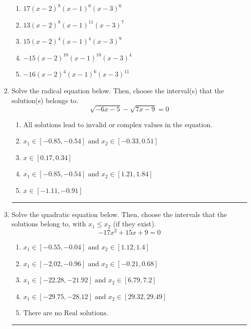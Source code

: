 \documentclass[14pt]{extbook}
\newcommand{\litem}[1]{\item#1\hspace*{-1cm}\rule{\textwidth}{0.4pt}}
\begin{document}
\begin{enumerate}
{\begin{center}
\end{center}
\begin{enumerate}[label=\Alph*.]
\item \( 17(x - 2)^{8} (x - 1)^{6} (x - 3)^{6} \)
\item \( 13(x - 2)^{8} (x - 1)^{11} (x - 3)^{7} \)
\item \( 15(x - 2)^{4} (x - 1)^{4} (x - 3)^{9} \)
\item \( -15(x - 2)^{10} (x - 1)^{10} (x - 3)^{4} \)
\item \( -16(x - 2)^{4} (x - 1)^{6} (x - 3)^{11} \)

\end{enumerate} }
\litem{
Solve the radical equation below. Then, choose the interval(s) that the solution(s) belongs to.\[ \sqrt{-6 x - 5} - \sqrt{7 x - 9} = 0 \]\begin{enumerate}[label=\Alph*.]
\item \( \text{All solutions lead to invalid or complex values in the equation.} \)
\item \( x_1 \in [-0.85, -0.54] \text{ and } x_2 \in [-0.33,0.51] \)
\item \( x \in [0.17,0.34] \)
\item \( x_1 \in [-0.85, -0.54] \text{ and } x_2 \in [1.21,1.84] \)
\item \( x \in [-1.11,-0.91] \)

\end{enumerate} }
\litem{
Solve the quadratic equation below. Then, choose the intervals that the solutions belong to, with $x_1 \leq x_2$ (if they exist).\[ -17x^{2} +15 x + 9 = 0 \]\begin{enumerate}[label=\Alph*.]
\item \( x_1 \in [-0.55, -0.04] \text{ and } x_2 \in [1.12, 1.4] \)
\item \( x_1 \in [-2.02, -0.96] \text{ and } x_2 \in [-0.21, 0.68] \)
\item \( x_1 \in [-22.28, -21.92] \text{ and } x_2 \in [6.79, 7.2] \)
\item \( x_1 \in [-29.75, -28.12] \text{ and } x_2 \in [29.32, 29.49] \)
\item \( \text{There are no Real solutions.} \)


\end{enumerate}}
\end{enumerate}
\end{document}
